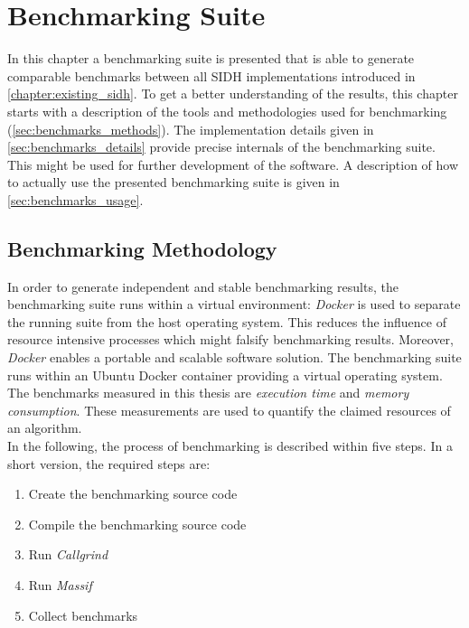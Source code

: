 \chapter{Benchmarking Suite}\label{chapter:benchmarking_suite}
In this chapter a benchmarking suite is presented that is able to generate comparable benchmarks between all \gls{SIDH} implementations introduced in \autoref{chapter:existing_sidh}. To get a better understanding of the results, this chapter starts with a  description of the tools and methodologies used for benchmarking (\autoref{sec:benchmarks_methods}). The implementation details given in \autoref{sec:benchmarks_details} provide precise internals of the benchmarking suite. This might be used for further development of the software. A description of how to actually use the presented benchmarking suite is given in \autoref{sec:benchmarks_usage}.

\section{Benchmarking Methodology}\label{sec:benchmarks_methods}
In order to generate independent and stable benchmarking results, the benchmarking suite runs within a virtual environment: \textit{Docker} is used to separate the running suite from the host operating system. This reduces the influence of resource intensive processes which might falsify benchmarking results. Moreover, \textit{Docker} enables a portable and scalable software solution. The benchmarking suite runs within an Ubuntu Docker container providing a virtual operating system.\\
The benchmarks measured in this thesis are \textit{execution time} and \textit{memory consumption}. These measurements are used to quantify the claimed resources of an algorithm. 
\\
In the following, the process of benchmarking is described within five steps. In a short version, the required steps are:

\begin{enumerate}
  \itemsep0em 
  \item Create the benchmarking source code
  \item Compile the benchmarking source code
  \item Run \textit{Callgrind}
  \item Run \textit{Massif}
  \item Collect benchmarks
\end{enumerate}

